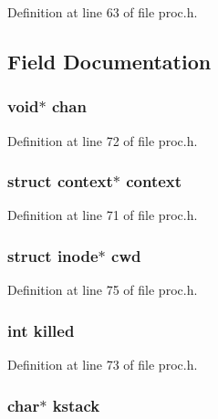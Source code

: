 Definition at line 63 of file proc.\-h.



\subsection{Field Documentation}
\hypertarget{structproc_ae26528bc7e93e1eb8573a30309dc1424}{
\subsubsection[{chan}]{\setlength{\rightskip}{0pt plus 5cm}void$\ast$ chan}}\label{structproc_ae26528bc7e93e1eb8573a30309dc1424}


Definition at line 72 of file proc.\-h.

\hypertarget{structproc_a30183e0aad45d3a56e1a22d3a8fecb17}{
\subsubsection[{context}]{\setlength{\rightskip}{0pt plus 5cm}struct {\bf context}$\ast$ {\bf context}}}\label{structproc_a30183e0aad45d3a56e1a22d3a8fecb17}


Definition at line 71 of file proc.\-h.

\hypertarget{structproc_a9dfc3cbb1d3bc4f1b196c07092aa64ec}{
\subsubsection[{cwd}]{\setlength{\rightskip}{0pt plus 5cm}struct {\bf inode}$\ast$ cwd}}\label{structproc_a9dfc3cbb1d3bc4f1b196c07092aa64ec}


Definition at line 75 of file proc.\-h.

\hypertarget{structproc_ab41bdc92598ccb9a0a7c2f177aa3bd5d}{
\subsubsection[{killed}]{\setlength{\rightskip}{0pt plus 5cm}int killed}}\label{structproc_ab41bdc92598ccb9a0a7c2f177aa3bd5d}


Definition at line 73 of file proc.\-h.

\hypertarget{structproc_ac9e6d1f1429b69e5e860320d95a3c5aa}{
\subsubsection[{kstack}]{\setlength{\rightskip}{0pt plus 5cm}char$\ast$ kstack}}\label{structproc_ac9e6d1f1429b69e5e860320d95a3c5aa}


